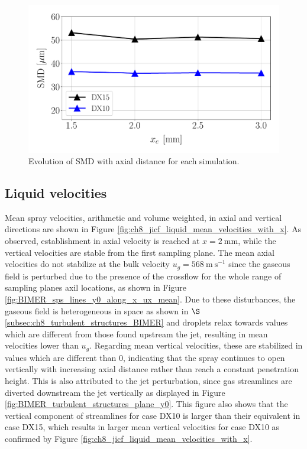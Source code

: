 \begin{figure}[ht]
\centering
   \includegraphics[scale=0.35]{./part3_applications/figures_ch8_resolved/SPRAY_characterization/SMD_values}
   \vspace*{-0.2in}
   \caption{Evolution of SMD with axial distance for each simulation.}
   \label{fig:ch8_spray_char_SMD_final}
\end{figure}





\subsection{Liquid velocities}

Mean spray velocities, arithmetic and volume weighted, in axial and vertical directions are shown in Figure \ref{fig:ch8_jicf_liquid_mean_velocities_with_x}. As observed, establishment in axial velocity is reached at $x = 2~\mathrm{mm}$, while the vertical velocities are stable from the first sampling plane. The mean axial velocities do not stabilize at the bulk velocity $u_g = 568~\mathrm{m~s}^{-1}$ since the gaseous field is perturbed due to the presence of the crossflow for the whole range of sampling planes axil locations, as shown in Figure \ref{fig:BIMER_sps_lines_y0_along_x_ux_mean}.   Due to these disturbances, the gaseous field is heterogeneous in space as shown in $\S$\ref{subsec:ch8_turbulent_structures_BIMER} and droplets relax towards values which are different from those found upstream the jet, resulting in mean velocities lower than $u_g$. Regarding mean vertical velocities, these are stabilized in values which are different than $0$, indicating that the spray continues to open vertically with increasing axial distance rather than reach a constant penetration height. This is also attributed to the jet perturbation, since gas streamlines are diverted downstream the jet vertically as displayed in Figure \ref{fig:BIMER_turbulent_structures_plane_y0}. This figure also shows that the vertical component of streamlines for case DX10 is larger than their equivalent in case DX15, which results in larger mean vertical velocities for case DX10 as confirmed by Figure \ref{fig:ch8_jicf_liquid_mean_velocities_with_x}.


